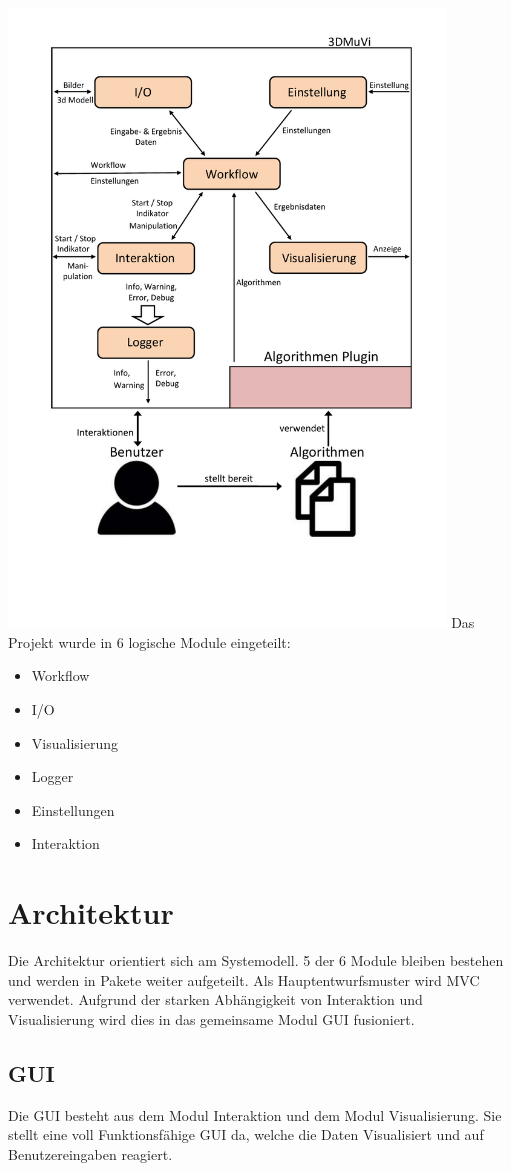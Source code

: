 \includegraphics[width=0.87\textwidth]{img/Datenflussuebersicht.pdf}
\newpage
Das Projekt wurde in 6 logische Module eingeteilt:
\begin{itemize}
\item Workflow
\item I/O
\item Visualisierung
\item Logger
\item Einstellungen
\item Interaktion
\end{itemize}
\section{Architektur}
Die Architektur orientiert sich am Systemodell. 5 der 6 Module bleiben bestehen und werden in Pakete weiter aufgeteilt. Als Hauptentwurfsmuster wird MVC verwendet.
Aufgrund der starken Abhängigkeit von Interaktion und Visualisierung wird dies in das gemeinsame Modul GUI fusioniert. 
\subsection{GUI}
Die GUI besteht aus dem Modul Interaktion und dem Modul Visualisierung.
Sie stellt eine voll Funktionsfähige GUI da, welche die Daten Visualisiert und auf Benutzereingaben reagiert.
